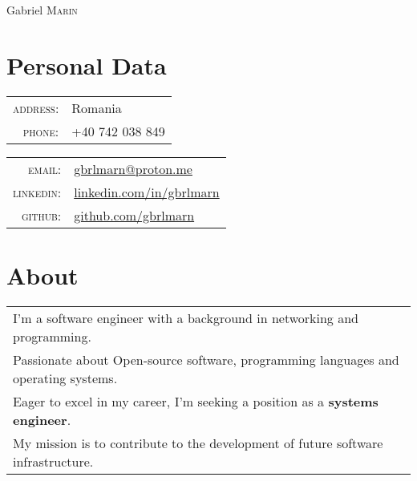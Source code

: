 \documentclass[a4paper,10pt]{article}
\begin{document}
\pagestyle{empty}

\par
  {\centering
    {\Huge Gabriel \textsc{Marin}}
    \bigskip\par
  }

\section{Personal Data}
\begin{multicols}{2}
  \begin{tabular}{rl}
    \textsc{address:}&Romania\\
    \textsc{phone:}&+40 742 038 849\\
  \end{tabular}
    \columnbreak
  \begin{tabular}{rl}
    \textsc{email:}&\href{mailto:gbrlmarn@proton.me}
      {gbrlmarn@proton.me}\\
    \textsc{linkedin:}&\href{https://linkedin.com/in/gbrlmarn}
      {linkedin.com/in/gbrlmarn}\\
    \textsc{github:}&\href{https://github.com/gbrlmarn}
      {github.com/gbrlmarn}\\
  \end{tabular}
\end{multicols}

\section{About}
\begin{tabular}{l}
I'm a software engineer with a background in 
networking and programming.\\
Passionate about Open-source software, 
programming languages and operating systems.\\
Eager to excel in my career, 
I'm seeking a position as a \textbf{systems engineer}.\\ 
My mission is to contribute to the development 
of future software infrastructure.\\
\end{tabular}

\end{document}
